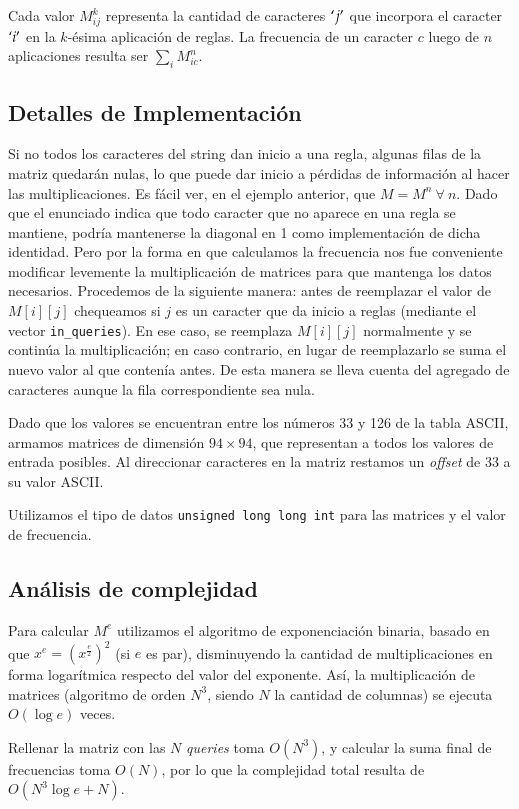 Cada valor $M_{ij}^k$ representa la cantidad de caracteres $`j'$ que incorpora
el caracter $`i'$ en la $k$-ésima aplicación de reglas. La frecuencia
de un caracter $c$ luego de $n$ aplicaciones resulta ser $\sum_i M_{ic}^n$.


\subsection*{Detalles de Implementación}

Si no todos los caracteres del string dan inicio a una regla, algunas filas de
la matriz quedarán nulas, lo que puede dar inicio a pérdidas de información al
hacer las multiplicaciones. Es fácil ver, en el ejemplo anterior, que $M=M^n\
\forall\ n$. Dado que el enunciado indica que todo caracter que no aparece en
una regla se mantiene, podría mantenerse la diagonal en 1 como implementación
de dicha identidad. Pero por la forma en que calculamos la frecuencia nos fue
conveniente modificar levemente la multiplicación de matrices para que
mantenga los datos necesarios. Procedemos de la siguiente manera: antes de
reemplazar el valor de $M[i][j]$ chequeamos si $j$ es un caracter que da
inicio a reglas (mediante el vector {\tt in\_queries}). En ese caso, se
reemplaza $M[i][j]$ normalmente y se continúa la multiplicación; en caso
contrario, en lugar de reemplazarlo se suma el nuevo valor al que contenía
antes. De esta manera se lleva cuenta del agregado de caracteres aunque la
fila correspondiente sea nula.

Dado que los valores se encuentran entre los números 33 y 126 de la tabla ASCII,
armamos matrices de dimensión $94\times 94$, que representan a todos los valores
de entrada posibles. Al direccionar caracteres en la matriz restamos un {\sl offset}
de 33 a su valor ASCII.

Utilizamos el tipo de datos {\tt unsigned long long int} para las matrices y
el valor de frecuencia.


\subsection*{Análisis de complejidad}

Para calcular $M^e$ utilizamos el algoritmo de exponenciación binaria, basado en
que $x^e = (x^\frac e 2)^2$ (si $e$ es par), disminuyendo la cantidad de
multiplicaciones en forma logarítmica respecto del valor del exponente. Así, la
multiplicación de matrices (algoritmo de orden $N^3$, siendo $N$
la cantidad de columnas) se ejecuta $O(\log e)$ veces.

Rellenar la matriz con las $N$ {\sl queries} toma $O(N^3)$, y calcular la suma
final de frecuencias toma $O(N)$, por lo que la complejidad total resulta de
$O(N^3\log e + N)$.
